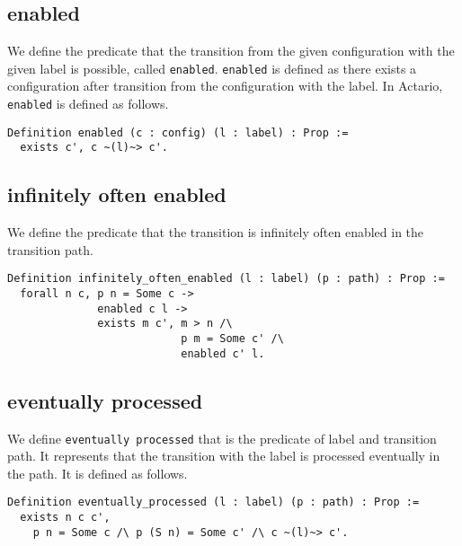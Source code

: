 \subsection{enabled}
We define the predicate that the transition from the given configuration with the given label is possible, called \texttt{enabled}.
\texttt{enabled} is defined as there exists a configuration after transition from the configuration with the label.
In Actario, \texttt{enabled} is defined as follows.

\begin{lstlisting}
Definition enabled (c : config) (l : label) : Prop :=
  exists c', c ~(l)~> c'.
\end{lstlisting}

\subsection{infinitely often enabled}
We define the predicate that the transition is infinitely often enabled in the transition path.

\begin{lstlisting}
Definition infinitely_often_enabled (l : label) (p : path) : Prop :=
  forall n c, p n = Some c ->
              enabled c l ->
              exists m c', m > n /\
                           p m = Some c' /\
                           enabled c' l.
\end{lstlisting}


\subsection{eventually processed}
We define \texttt{eventually processed} that is the predicate of label and transition path.
It represents that the transition with the label is processed eventually in the path.
It is defined as follows.

\begin{lstlisting}
Definition eventually_processed (l : label) (p : path) : Prop :=
  exists n c c',
    p n = Some c /\ p (S n) = Some c' /\ c ~(l)~> c'.
\end{lstlisting}


